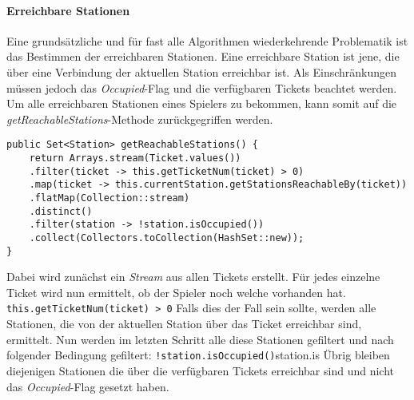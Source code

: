                 \paragraph{Erreichbare Stationen}
                    Eine grundsätzliche und für fast alle Algorithmen wiederkehrende Problematik ist das Bestimmen der erreichbaren Stationen.
                    Eine erreichbare Station ist jene, die über eine Verbindung der aktuellen Station erreichbar ist.
                    Als Einschränkungen müssen jedoch das \textit{Occupied}-Flag und die verfügbaren Tickets beachtet werden.
                    Um alle erreichbaren Stationen eines Spielers zu bekommen, kann somit auf die \textit{getReachableStations}-Methode
                    zurückgegriffen werden.

                    \begin{lstlisting}
public Set<Station> getReachableStations() {
    return Arrays.stream(Ticket.values())
    .filter(ticket -> this.getTicketNum(ticket) > 0)
    .map(ticket -> this.currentStation.getStationsReachableBy(ticket))
    .flatMap(Collection::stream)
    .distinct()
    .filter(station -> !station.isOccupied())
    .collect(Collectors.toCollection(HashSet::new));
}
                    \end{lstlisting}
                    Dabei wird zunächst ein \textit{Stream} aus allen Tickets erstellt.
                    Für jedes einzelne Ticket wird nun ermittelt, ob der Spieler noch welche vorhanden hat.
                    \newline
                    \newline
                    \texttt{this.getTicketNum(ticket) > 0}
                    \newline
                    \newline
                    Falls dies der Fall sein sollte, werden alle Stationen, die von der aktuellen Station über das Ticket erreichbar sind,
                    ermittelt. Nun werden im letzten Schritt alle diese Stationen gefiltert und nach folgender Bedingung gefiltert:
                    \newline
                    \newline
                    \texttt{!station.isOccupied()}station.is
                    \newline
                    \newline
                    Übrig bleiben diejenigen Stationen die über die verfügbaren Tickets erreichbar sind und nicht das \textit{Occupied}-Flag
                    gesetzt haben.


